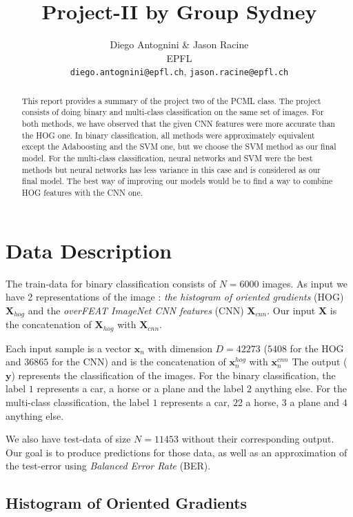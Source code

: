 \documentclass{article} %
\title{Project-II by Group Sydney}
\author{
Diego Antognini \& Jason Racine\\
EPFL \\
\texttt{diego.antognini@epfl.ch}, \texttt{jason.racine@epfl.ch} \\
}
\begin{document}
\maketitle

\begin{abstract}
This report provides a summary of the project two of the PCML class. The project consists of doing binary and multi-class classification on the same set of images. For both methods, we have observed that the given CNN features were more accurate than the HOG one. In binary classification, all methods were approximately equivalent except the Adaboosting and the SVM one, but we choose the SVM method as our final model. For the multi-class classification, neural networks and SVM were the best methods but neural networks has less variance in this case and is considered as our final model. The best way of improving our models would be to find a way to combine HOG features with the CNN one.

\end{abstract}

\section{Data Description}

The train-data for binary classification consists of $N = 6000$ images. As input we have 2 representations of the image : \textit{the histogram of oriented gradients} (HOG) $\mathbf{X}_{hog}$ and the \textit{overFEAT ImageNet CNN features} (CNN) $\mathbf{X}_{cnn}$. Our input $\mathbf{X}$ is the concatenation of $\mathbf{X}_{hog}$ with $\mathbf{X}_{cnn}$. 

Each input sample is a vector $\mathbf{x}_n$ with dimension $D = 42273$ ($5408$ for the HOG and $36865$ for the CNN) and is the concatenation of $\mathbf{x}_n^{hog}$ with $\mathbf{x}_n^{cnn}$
The output ($\mathbf{y}$) represents the classification of the images. For the binary classification, the label $1$  represents a car, a horse or a plane and the label $2$ anything else. For the multi-class classification, the label $1$ represents a car, $2$2 a horse, $3$ a plane and $4$ anything else.

We also have test-data of size $N=11453$ without their corresponding output. Our goal is to produce predictions for those data, as well as an approximation of the test-error using \textit{Balanced Error Rate} (BER).

\subsection{Histogram of Oriented Gradients}
\end{document}
